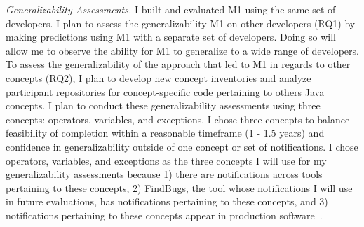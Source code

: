 \documentclass{llncs}
\begin{document}
\vspace{0.5em}
\noindent\textit{Generalizability Assessments.}
I built and evaluated M1 using the same set of developers. I plan to assess the generalizability M1 on other developers (RQ1) by making predictions using M1 with a separate set of developers. Doing so will allow me to observe the ability for M1 to generalize to a wide range of developers. 
To assess the generalizability of the approach that led to M1 in regards to other concepts (RQ2), I plan to develop new concept inventories and analyze participant repositories for concept-specific code pertaining to others Java concepts.
I plan to conduct these generalizability assessments using three concepts: operators, variables, and exceptions.
I chose three concepts to balance feasibility of completion within a reasonable timeframe (1 - 1.5 years) and confidence in generalizability outside of one concept or set of notifications.
I chose operators, variables, and exceptions as the three concepts I will use for my generalizability assessments because 1) there are notifications across tools pertaining to these concepts, 2) FindBugs, the tool whose notifications I will use in future evaluations, has notifications pertaining to these concepts, and 3) notifications pertaining to these concepts appear in production software~\cite{ayewah2007evaluating}.
%
\end{document}
